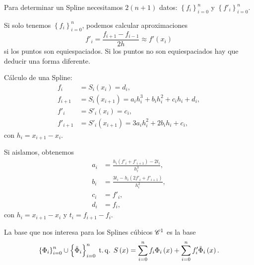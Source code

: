 Para determinar un Spline necesitamos $2(n+1)$ datos: $\left\{ f_i \right\}_{i=0}^n$ y $\left\{ f'_i \right\}_{i=0}^n$.

\begin{obs}
    Si solo tenemos $\left\{ f_i \right\}_{i=0}^n$, podemos calcular aproximaciones
    \[
        f'_i = \frac{f_{i+1}-f_{i-1}}{2h}\approx f'\left( x_i \right)
    \]
    si los puntos son equiespaciados. Si los puntos no son equiespaciados hay que deducir una forma diferente.

    Cálculo de una Spline:
    \begin{align*}
        f_i &= S_i\left( x_i \right) = d_i, \\
        f_{i+1} &= S_i\left( x_{i+1} \right) = a_i h_i^3 + b_ih_i^2 + c_ih_i + d_i, \\
        f'_i &= S'_i\left( x_i \right) = c_i, \\
        f'_{i+1} &= S'_i\left( x_{i+1} \right) = 3a_ih_i^2 + 2b_ih_i + c_i,
    \end{align*}
    con $h_i = x_{i+1} - x_i$.

    Si aislamos, obtenemos
    \begin{align*}
        a_i &= \frac{h_i\left( f'_i + f'_{i+1} \right) - 2t_i}{h_i^3}, \\
        b_i &= \frac{3t_i - h_i\left( 2f'_i + f'_{i+1} \right)}{h_i^2}, \\
        c_i &= f'_i, \\
        d_i &= f_i,
    \end{align*}
    con $h_i = x_{i+1} - x_i$ y $t_i = f_{i+1} - f_i$.
\end{obs}

La base que nos interesa para los Splines cúbicos $\mathscr{C}^1$ es la base 
\[
    \left\{ \Phi_i \right\}_{i=0}^n \cup \left\{ \tilde{\Phi}_i \right\}_{i=0}^n \operatorname{\;t.q.\;} S\left( x \right) = \sum_{i=0}^n f_i\Phi_i\left( x \right) + \sum_{i=0}^n f'_i\tilde{\Phi}_i\left( x \right).
\]

